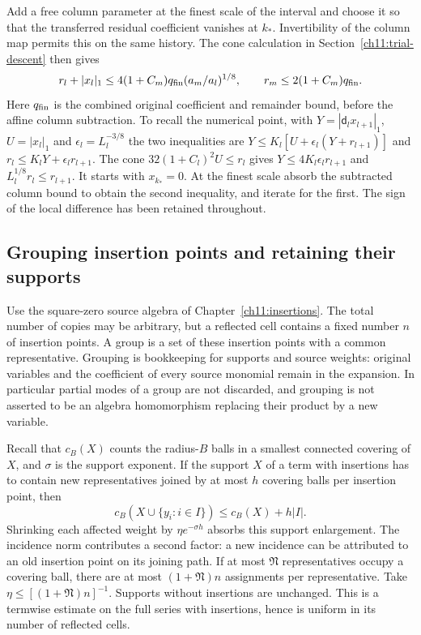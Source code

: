 Add a free column parameter at the finest scale of the interval and choose it so that
the transferred residual coefficient vanishes at $k_*$. Invertibility
of the column map permits this on the same history. The cone calculation
in Section~\ref{ch11:trial-descent} then gives
\begin{equation}
 r_l+|x_l|_1\le4(1+C_m)q_{\rm fin}(a_m/a_l)^{1/8},
 \qquad r_m\le2(1+C_m)q_{\rm fin}.
 \label{ch18:signed-transport}
\end{equation}
Here $q_{\rm fin}$ is the combined original coefficient and remainder
bound, before the affine column subtraction. To recall the numerical
point, with $Y=|\mathsf d_lx_{l+1}|_1$, $U=|x_l|_1$ and
$\epsilon_l=L_l^{-3/8}$ the two inequalities are
$Y\le K_l[U+\epsilon_l(Y+r_{l+1})]$ and
$r_l\le K_lY+\epsilon_lr_{l+1}$.
The cone $32(1+C_l)^2U\le r_l$ gives
$Y\le4K_l\epsilon_lr_{l+1}$ and $L_l^{1/8}r_l\le r_{l+1}$.
It starts with $x_{k_*}=0$. At the finest scale absorb the subtracted
column bound to obtain the second inequality, and iterate for the first.
The sign of the local difference has been retained throughout.

\subsection{Grouping insertion points and retaining their supports}

Use the square-zero source algebra of Chapter~\ref{ch11:insertions}.
The total number of copies may be arbitrary, but a reflected cell
contains a fixed number $n$ of insertion points. A group is a set of
these insertion points with a common representative. Grouping is bookkeeping for
supports and source weights: original variables and the coefficient of every source monomial
remain in the expansion. In particular partial modes of a group are
not discarded, and grouping is not asserted to be an algebra
homomorphism replacing their product by a new variable.

Recall that $c_B(X)$ counts the radius-$B$ balls in a smallest connected covering of $X$, and $\sigma$ is the support exponent.
If the support $X$ of a term with insertions has to contain new representatives joined
by at most $h$ covering balls per insertion point, then
\[
 c_B(X\cup\{y_i:i\in I\})\le c_B(X)+h|I|.
\]
Shrinking each affected weight by $\eta e^{-\sigma h}$ absorbs this
support enlargement. The incidence norm contributes a second factor: a new
incidence can be attributed to an old insertion point on its joining path.
If at most $\mathfrak N$ representatives occupy a covering ball, there
are at most $(1+\mathfrak N)n$ assignments per representative.
Take $\eta\le[(1+\mathfrak N)n]^{-1}$. Supports without insertions are
unchanged. This is a termwise estimate on the full
series with insertions, hence is uniform in its number of reflected cells.

